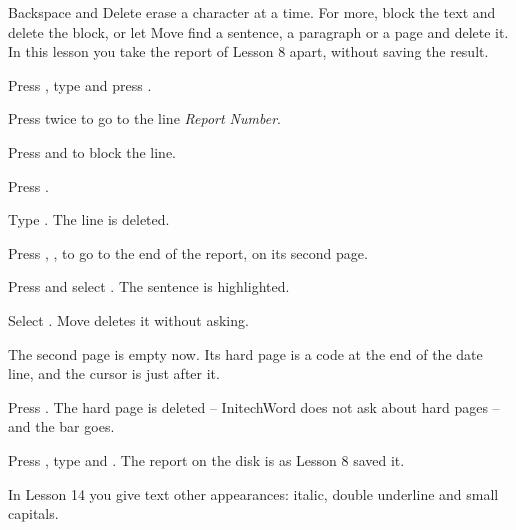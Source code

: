 Backspace and Delete erase a character at a time.  For more, block the text
and delete the block, or let Move find a sentence, a paragraph or a page and
delete it.  In this lesson you take the report of Lesson 8 apart, without
saving the result.

\begin{WPSteps}
\item Press , type  and press
.
\item Press  twice to go to the line \textit{Report
Number}.
\item Press  and  to block the line.
\item Press .
\end{WPSteps}
\begin{WPSteps}[resume]
\item Type .  The line is deleted.
\end{WPSteps}

\begin{WPSteps}
\item Press , ,  to go to the end
of the report, on its second page.
\item Press  and select .  The
sentence is highlighted.
\item Select .  Move deletes it without asking.
\end{WPSteps}

The second page is empty now.  Its hard page is a code at the end of the
date line, and the cursor is just after it.
\begin{WPSteps}
\item Press .  The hard page is deleted -- InitechWord
does not ask about hard pages -- and the bar goes.
\end{WPSteps}

\begin{WPSteps}
\item Press , type  and .  The report
on the disk is as Lesson 8 saved it.
\end{WPSteps}
\EndReplay
In Lesson 14 you give text other appearances: italic, double underline and
small capitals.
